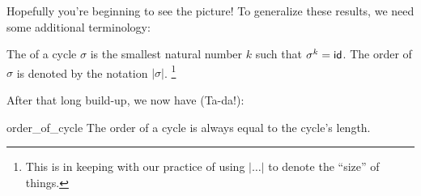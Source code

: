 \noindent
Hopefully you're beginning to see the picture! To generalize these results, we need some additional terminology:

\begin{defn}\label{def_order_cycle}
The  of a cycle $\sigma$ is the smallest natural number $k$ such that $\sigma^k = {\sf{i}d}$.   The order of $\sigma$ is denoted by the notation $|\sigma|$.
\footnote{This is in keeping with our practice of using $|\ldots|$ to denote the ``size'' of things.}
\end{defn}
After that long build-up, we now have (Ta-da!):

\begin{prop}{order_of_cycle}
The order of a cycle is always equal to the cycle's length.
\end{prop}



